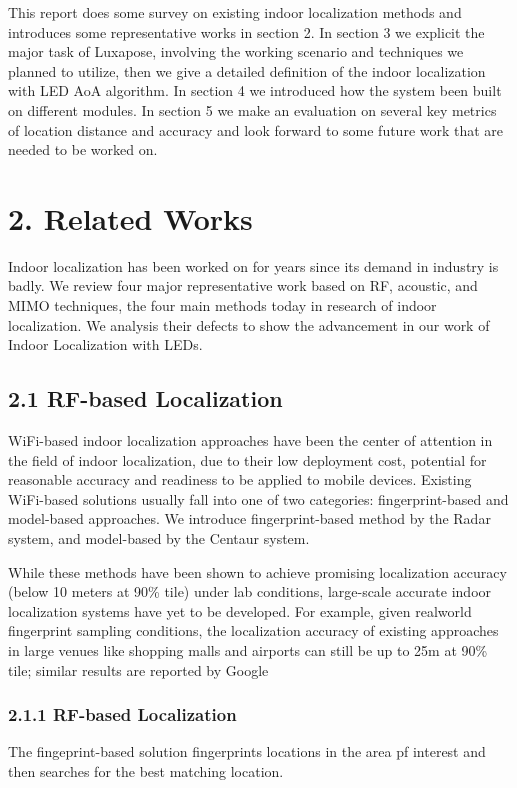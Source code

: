 \documentclass[a4paper, 11pt]{article} %
\begin{document}
 

This report does some survey on existing indoor localization methods and introduces some representative works in section 2. In section 3 we explicit the major task of Luxapose, involving the working scenario and techniques we planned to utilize, then we give a detailed definition of the indoor localization with LED AoA algorithm. In section 4 we introduced how the system been built on different modules. In section 5 we make an evaluation on several key metrics of location distance and accuracy and look forward to some future work that are needed to be worked on.


\section*{2. Related Works}
Indoor localization has been worked on for years since its demand in industry is badly. We review four major representative work based on RF, acoustic, and MIMO techniques, the four main methods today in research of indoor localization. We analysis their defects to show the advancement in our work of Indoor Localization with LEDs.

\subsection*{2.1 RF-based Localization \cite{Radar00} \cite{Centaur12}}
WiFi-based indoor localization approaches have been the center of attention in the field of indoor localization, due to their low deployment cost, potential for reasonable accuracy and readiness to be applied to mobile devices. Existing WiFi-based solutions usually fall into one of two categories: fingerprint-based and model-based approaches. We introduce fingerprint-based method by the Radar system, and model-based by the Centaur system.

While these methods have been shown to achieve promising localization accuracy (below 10 meters at 90\% tile) under lab conditions, large-scale accurate indoor localization systems have yet to be developed. For example, given realworld fingerprint sampling conditions, the localization accuracy of existing approaches in large venues like shopping malls and airports can still be up to 25m at 90\% tile; similar results are reported by Google\cite{google}

\subsubsection*{2.1.1 RF-based Localization \cite{Radar00}}
The fingeprint-based solution fingerprints locations in the area pf interest and then searches for the best matching location.
\end{document}
